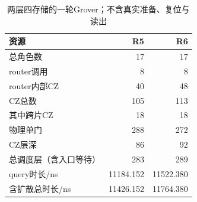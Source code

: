 \begin{table}[htbp]\centering\small
\caption{两层四存储的一轮Grover；不含真实准备、复位与读出}\label{tab:resources}
\begin{tabular}{@{}lrr@{}}\toprule
资源 & R5 & R6\\\midrule
总角色数 & 17 & 17\\
router调用 & 8 & 8\\
router内部CZ & 40 & 48\\
CZ总数 & 105 & 113\\
其中跨片CZ & 18 & 18\\
物理单门 & 288 & 272\\
CZ层深 & 86 & 92\\
总调度层（含入口等待） & 283 & 289\\
query时长/ns & 11184.152 & 11522.380\\
含扩散总时长/ns & 11426.152 & 11764.380\\
\bottomrule\end{tabular}\end{table}
